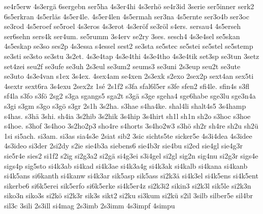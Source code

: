 {    se4r5erw
    4s3ergä
    6sergebn
    ser5ha
    4s3er4hi
    4s3erhö
    se4r3id
    3serie
    ser5inner
    serk2
    6s5erkran
    4s5erläs
    4s5er4le.
    4s5er4len
    4s5ermah
    ser3na
    4s5ernte
    ser3o4b
    ser3oc
    se3rod
    4s5eroef
    se5roel
    4s3eros
    4s3erot
    4s3eröf
    se3röl
    s4ers.
    sersau4
    4s5erseh
    ser6sehn
    sers4k
    ser4um.
    se5rumm
    3s4erv
    se2ry
    3ses.
    sesch4
    4s3e4sel
    se5skan
    4s5eskap
    se3so
    ses2p
    4s3essa
    s4essel
    sest2
    se3sta
    se5stec
    se5stei
    se5stel
    se5stemp
    se3sti
    se3sto
    se3stu
    3s2et.
    4s3e4tap
    4s3e4thi
    4s3e4tho
    4s3e4tik
    set3sp
    se3tun
    3setz
    set4zei
    seu2f
    se3ufe
    se3uh
    2s3eul
    se3um2
    seums3
    se3uni
    2s3eup
    seu2t
    se3ute
    se3uto
    4s3e4van
    s1ex
    3s4ex.
    4sex4am
    se4xen
    2s3exk
    s2exo
    2sex2p
    sext4an
    sex5ti
    4sextr
    sext6ra
    3s4exu
    2sex2z
    1sé
    2s1f2
    s3fa
    sfal6l5er
    s3fe
    sfen2
    sfi4le.
    sfin4s
    s3fl
    sf4la
    s3fo
    s3fö
    2sg2
    s3ga
    sgangs5
    sga2t
    s3gä
    s3ge
    sgeha4
    sge6habe
    sge3lu
    sge3n4a
    s3gi
    s3gm
    s3go
    s3gö
    s3gr
    2s1h
    3s2ha.
    s3hae
    s4ha4ke.
    shal4li
    shalt4s5
    3s4hamp
    s4has.
    s3hä
    3shi.
    sh4ia
    3s2hib
    3s2hik
    3s4hip
    3s4hirt
    sh1l
    sh1n
    sh2o
    s3hoc
    s3hoe
    s4hoe.
    s3hof
    3s4hoo
    3s2ho2p3
    sho4re
    s4horts
    3s4ho2w3
    s3hö
    sh2r
    sh4re
    sh2u
    sh2ü
    1si
    si5ach.
    si3am.
    si3as
    sia4s3e
    2siat
    sib2
    3sic
    sichts5te
    sicker5e
    4s3i4dea
    4s3idee
    4s3ideo
    si3der
    2si2dy
    s2ie
    sie4b3a
    siebens6
    sie4b3r
    sie4bu
    si2ed
    sie4gl
    sie4g3r
    sie5r4e
    sies2
    si1f2
    s2ig
    si2g3a2
    si2gä
    si4g3ei
    s3i4gel
    si2gl
    sig2n
    sig4nu
    si2g3r
    sigs4e
    sigs4p
    sig5sto
    si4k3ab
    si4kad
    si4k3ae
    si4k3a4g
    si4k3ak
    si4kalb
    si4kana
    si4kanb
    si4k5ans
    si6kanth
    si4kanw
    si4k3ar
    sik5asp
    sik5ass
    si2k3ä
    si4k3el
    si4k5ens
    si4k5ent
    sikerbe6
    si6k5erei
    sik5erfo
    si6k5erke
    si4k5er4z
    si2k3i2
    sikin3
    si2k3l
    sik5le
    si2k3n
    siko3n
    siko3s
    si2kö
    si2k3r
    sik3s
    sikt2
    si2ku
    si3kum
    si2kü
    s2il
    3silb
    silber5e
    sil4br
    sil3c
    3sili
    2s3ill
    si4mag
    2s3imb
    2s3imm
    4s3impf
    4simpu
}
